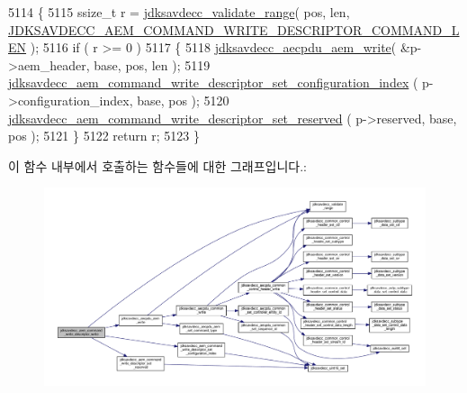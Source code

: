 \begin{DoxyCode}
5114 \{
5115     ssize\_t r = \hyperlink{group__util_ga9c02bdfe76c69163647c3196db7a73a1}{jdksavdecc\_validate\_range}( pos, len, 
      \hyperlink{group__command__write__descriptor_gadc606ecafdc18573d817f098cbebd26c}{JDKSAVDECC\_AEM\_COMMAND\_WRITE\_DESCRIPTOR\_COMMAND\_LEN} );
5116     \textcolor{keywordflow}{if} ( r >= 0 )
5117     \{
5118         \hyperlink{group__aecpdu__aem_gad658e55771cce77cecf7aae91e1dcbc5}{jdksavdecc\_aecpdu\_aem\_write}( &p->aem\_header, base, pos, len );
5119         \hyperlink{group__command__write__descriptor_ga73d001e932056fc18f0902729bfdc4e7}{jdksavdecc\_aem\_command\_write\_descriptor\_set\_configuration\_index}
      ( p->configuration\_index, base, pos );
5120         \hyperlink{group__command__write__descriptor_ga6514b188ff90af7a2bfc991da10bd385}{jdksavdecc\_aem\_command\_write\_descriptor\_set\_reserved}
      ( p->reserved, base, pos );
5121     \}
5122     \textcolor{keywordflow}{return} r;
5123 \}
\end{DoxyCode}


이 함수 내부에서 호출하는 함수들에 대한 그래프입니다.\+:
\nopagebreak
\begin{figure}[H]
\begin{center}
\leavevmode
\includegraphics[width=350pt]{group__command__write__descriptor_ga20bbb90a439bff4c011be9f8c6211d47_cgraph}
\end{center}
\end{figure}



